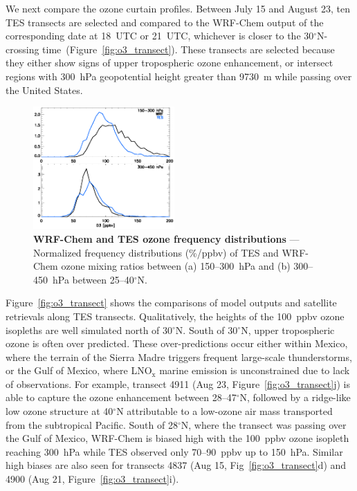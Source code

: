 We next compare the ozone curtain profiles. Between July 15 and August 23, ten TES
transects are selected and compared to the WRF-Chem output of the corresponding
date at 18~UTC or 21~UTC, whichever is closer to the 30$^\circ$N-crossing
time~(Figure~\ref{fig:o3_transect}). These transects are selected because they either show
signs of upper tropospheric ozone enhancement, or intersect regions with 300~hPa
geopotential height greater than 9730~m  while passing over the United States.

\begin{figure}
	\centering
	\begin{singlespacing}
	\includegraphics[width=0.48\textwidth]{Figures/o3/o3_teswrfhist.eps}
	\caption[WRF-Chem and TES ozone frequency distributions]{{\small\textbf{WRF-Chem and TES ozone frequency distributions} ---
	Normalized frequency distributions (\%/ppbv) of TES and WRF-Chem ozone mixing ratios between (a) 150--300~hPa and (b)
	300--450~hPa between 25--40$^\circ$N.}}
	\label{fig:o3_distr}
	\end{singlespacing}
\end{figure}

Figure~\ref{fig:o3_transect} shows the comparisons of model outputs and satellite retrievals along TES transects.
Qualitatively, the heights of the 100~ppbv ozone isopleths are well simulated north of
30$^\circ$N. South of 30$^\circ$N, upper tropospheric ozone is often over predicted.
These over-predictions occur either within Mexico, where the terrain of the Sierra Madre
triggers frequent large-scale thunderstorms, or the Gulf of Mexico, where LNO$_{\mathrm{x}}$
marine emission is unconstrained due to lack of observations. For example, transect 4911 (Aug 23, Figure~\ref{fig:o3_transect}j)
is able to capture the ozone enhancement between 28--47$^\circ$N, followed by a
ridge-like low ozone structure at 40$^\circ$N attributable to a low-ozone air mass
transported from the subtropical Pacific. South of 28$^\circ$N, where the transect
was passing over the Gulf of Mexico, WRF-Chem is biased high with the 100~ppbv
ozone isopleth reaching 300~hPa while TES observed only 70--90~ppbv up to 150~hPa.
Similar high biases are also seen for transects 4837 (Aug 15, Fig~\ref{fig:o3_transect}d)
and 4900 (Aug 21, Figure~\ref{fig:o3_transect}i).

